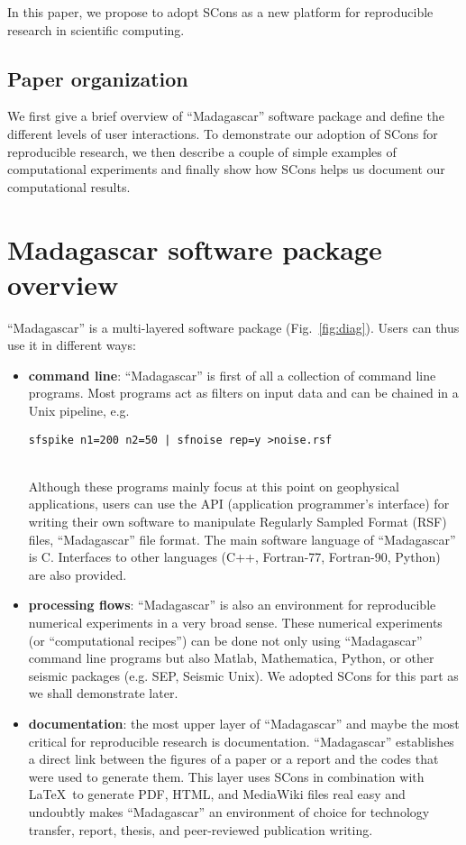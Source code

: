 In this paper, we propose to adopt SCons as a new platform for
reproducible research in scientific computing.

\subsection{Paper organization}

We first give a brief overview of ``Madagascar'' software package and
define the different levels of user interactions. To demonstrate our
adoption of SCons for reproducible research, we then describe a couple
of simple examples of computational experiments and finally show how
SCons helps us document our computational results.

\section{Madagascar software package overview}
%
%
``Madagascar'' is a multi-layered software package
(Fig.~\ref{fig:diag}). Users can thus use it in different ways:
%
\begin{itemize}
\item \textbf{command line}: ``Madagascar'' is first of all a
  collection of command line programs. Most programs act as filters on
  input data and can be chained in a Unix pipeline, e.g.
\begin{verbatim}sfspike n1=200 n2=50 | sfnoise rep=y >noise.rsf\end{verbatim}\\
Although these programs mainly focus at this point on geophysical
applications, users can use the API (application programmer's
interface) for writing their own software to manipulate Regularly
Sampled Format (RSF) files, ``Madagascar'' file format. The main
software language of ``Madagascar'' is C. Interfaces to other
languages (C++, Fortran-77, Fortran-90, Python) are also provided.
\item \textbf{processing flows}: ``Madagascar'' is also an environment
  for reproducible numerical experiments in a very broad sense. These
  numerical experiments (or ``computational recipes'') can be done not
  only using ``Madagascar'' command line programs but also Matlab,
  Mathematica, Python, or other seismic packages (e.g. SEP, Seismic
  Unix). We adopted SCons for this part as we shall demonstrate later.
\item \textbf{documentation}: the most upper layer of ``Madagascar''
  and maybe the most critical for reproducible research is
  documentation. ``Madagascar'' establishes a direct link between the
  figures of a paper or a report and the codes that were used to
  generate them. This layer uses SCons in combination with \LaTeX\ to
  generate PDF, HTML, and MediaWiki files real easy and undoubtly
  makes ``Madagascar'' an environment of choice for technology
  transfer, report, thesis, and peer-reviewed publication writing.
\end{itemize}

